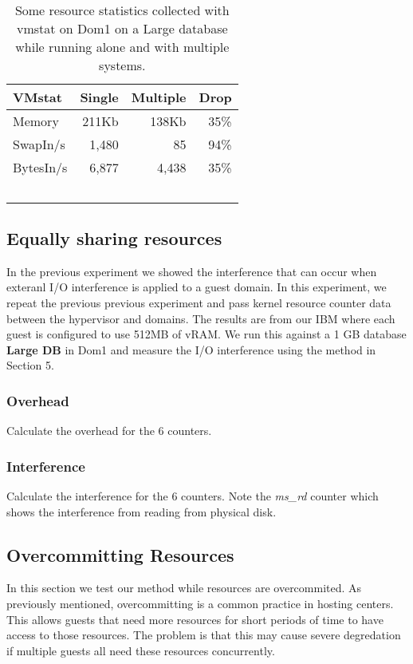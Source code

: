 \begin{table}[h]
  \begin{tabular}{ l | r | r | r }
    VMstat & Single & Multiple & Drop \\ \hline
	Memory & 211Kb & 138Kb & 35\% \\
	SwapIn/s & 1,480 & 85 & 94\% \\
	BytesIn/s & 6,877 & 4,438 & 35\% \\
  \end{tabular}
\caption{Some resource statistics collected with vmstat on Dom1 on a Large database while running alone and with multiple systems.} 
\label{fig:vmstat}
\end{table}

\subsection{Equally sharing resources}
In the previous experiment we showed the interference that can occur when exteranl I/O interference is applied to a guest domain.
In this experiment, we repeat the previous previous experiment and pass kernel resource counter data between the hypervisor and domains.  
The results are from our IBM where each guest is configured to use 512MB of vRAM.
We run this against a 1 GB database \textbf{Large DB} in Dom1 and measure the I/O interference using the method in Section 5.  

\subsubsection{Overhead}
Calculate the overhead for the 6 counters.

\subsubsection{Interference}
Calculate the interference for the 6 counters.  Note the \emph{ms\_rd} counter which shows the interference from reading from physical disk.


\subsection{Overcommitting Resources}
In this section we test our method while resources are overcommited.  
As previously mentioned, overcommitting is a common practice in hosting centers.  
This allows guests that need more resources for short periods of time to have access to those resources.  
The problem is that this may cause severe degredation if multiple guests all need these resources concurrently.  

